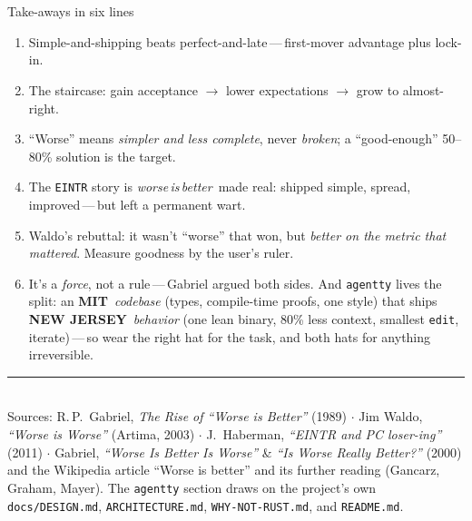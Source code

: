 \documentclass[11pt]{article}
\let\oldsection\section
\renewcommand{\section}[1]{\oldsection{\sffamily\bfseries\large #1}}
\newcommand{\NJ}{\textcolor{terra}{\sffamily\bfseries NEW JERSEY}}
\newcommand{\MITs}{\textcolor{slate}{\sffamily\bfseries MIT}}
\newcommand{\wib}{\textit{worse\,is\,better}}
\begin{document}
\section*{Take-aways in six lines}
\begin{enumerate}[leftmargin=1.6em]
  \item Simple-and-shipping beats perfect-and-late\,---\,first-mover advantage
        plus lock-in.
  \item The staircase: gain acceptance $\rightarrow$ lower expectations
        $\rightarrow$ grow to almost-right.
  \item ``Worse'' means \emph{simpler and less complete}, never \emph{broken}; a
        ``good-enough'' 50--80\% solution is the target.
  \item The \texttt{EINTR} story is \wib\ made real: shipped simple, spread,
        improved\,---\,but left a permanent wart.
  \item Waldo's rebuttal: it wasn't ``worse'' that won, but \emph{better on the
        metric that mattered}. Measure goodness by the user's ruler.
  \item It's a \emph{force}, not a rule\,---\,Gabriel argued both sides. And
        \texttt{agentty} lives the split: an \MITs\ \emph{codebase} (types,
        compile-time proofs, one style) that ships \NJ\ \emph{behavior} (one lean
        binary, 80\% less context, smallest \texttt{edit}, iterate)\,---\,so wear
        the right hat for the task, and both hats for anything irreversible.
\end{enumerate}

\vfill
\begin{center}
{\color{brass}\rule{0.35\linewidth}{0.4pt}}\\[6pt]
{\sffamily\scriptsize\color{faint}
Sources: R.\,P.\ Gabriel, \emph{The Rise of ``Worse is Better''} (1989) $\cdot$
Jim Waldo, \emph{``Worse is Worse''} (Artima, 2003) $\cdot$
J.\ Haberman, \emph{``EINTR and PC loser-ing''} (2011) $\cdot$
Gabriel, \emph{``Worse Is Better Is Worse''} \& \emph{``Is Worse Really Better?''} (2000)\\
and the Wikipedia article ``Worse is better'' and its further reading
(Gancarz, Graham, Mayer). The \texttt{agentty} section draws on the project's own
\texttt{docs/DESIGN.md}, \texttt{ARCHITECTURE.md}, \texttt{WHY-NOT-RUST.md}, and
\texttt{README.md}.}
\end{center}
\end{document}
